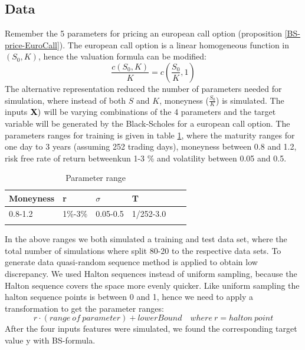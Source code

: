 \subsection{Data}
Remember the 5 parameters for pricing an european call option (proposition \ref{BS-price-EuroCall}).  The european call option is a linear homogeneous function in $(S_0,K)$, hence the valuation formula can be modified:
$$\frac{c(S_0,K)}{K}=c(\frac{S_0}{K},1)$$
The alternative representation reduced the number of parameters needed for simulation, where instead of both $S$ and $K$, moneyness ($\frac{S_0}{K}$) is simulated. The inputs $\mathbf{X})$ will be varying combinations of the 4 parameters and the target variable will be generated by the Black-Scholes for a european call option. The parameters ranges for training is given in table \ref{tab:euroParRange}, where the maturity ranges for one day to 3 years (assuming 252 trading days), moneyness between 0.8 and 1.2, risk free rate of return betweenkun 1-3 \% and volatility between 0.05 and 0.5. 

\begin{table}[th]
\caption{Parameter range}
\label{tab:euroParRange}
\centering
\begin{tabular}{l l l l l l }
\toprule
\textbf{Moneyness} & \textbf{r} & \textbf{$\sigma$} & \textbf{T} \\
\midrule
0.8-1.2 & 1\%-3\% & 0.05-0.5 & 1/252-3.0\\ 
\bottomrule\\
\end{tabular}
\end{table}

In the above ranges we both simulated a training and test data set, where the total number of simulations where split 80-20 to the respective data sets. To generate data quasi-random sequence method is applied to obtain low discrepancy. We used Halton sequences instead of uniform sampling, because the Halton sequence covers the space more evenly quicker. Like uniform sampling the halton sequence points is between 0 and 1, hence we need to apply a transformation to get the parameter ranges:
$$r \cdot (range \ of \ parameter) + lowerBound \quad where \ r=halton \ point$$
After the four inputs features were simulated, we found the corresponding target value y with BS-formula. 

